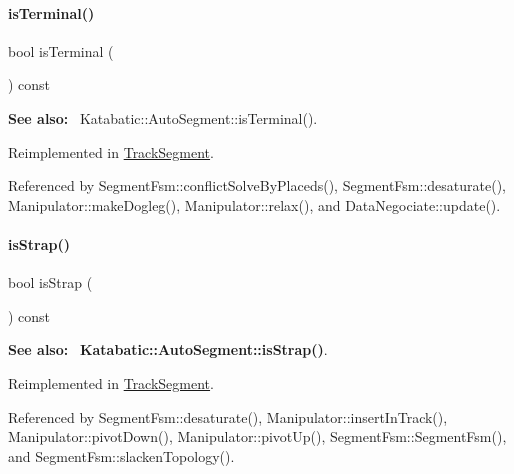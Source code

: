 \mbox{\label{classKite_1_1TrackElement_a1e074cb3064037035548e5e6d238e315}} 
\paragraph{\texorpdfstring{is\+Terminal()}{isTerminal()}}
{\footnotesize\ttfamily bool is\+Terminal (\begin{DoxyParamCaption}{ }\end{DoxyParamCaption}) const\hspace{0.3cm}{\ttfamily [virtual]}}

{\bfseries See also\+:}~ Katabatic\+::\+Auto\+Segment\+::is\+Terminal(). 

Reimplemented in \hyperlink{classKite_1_1TrackSegment_a1e074cb3064037035548e5e6d238e315}{Track\+Segment}.



Referenced by Segment\+Fsm\+::conflict\+Solve\+By\+Placeds(), Segment\+Fsm\+::desaturate(), Manipulator\+::make\+Dogleg(), Manipulator\+::relax(), and Data\+Negociate\+::update().

\mbox{\label{classKite_1_1TrackElement_a62d61c231cf404a814ae37665fa8164f}} 
\paragraph{\texorpdfstring{is\+Strap()}{isStrap()}}
{\footnotesize\ttfamily bool is\+Strap (\begin{DoxyParamCaption}{ }\end{DoxyParamCaption}) const\hspace{0.3cm}{\ttfamily [virtual]}}

{\bfseries See also\+:}~ \textbf{ Katabatic\+::\+Auto\+Segment\+::is\+Strap()}. 

Reimplemented in \hyperlink{classKite_1_1TrackSegment_a62d61c231cf404a814ae37665fa8164f}{Track\+Segment}.



Referenced by Segment\+Fsm\+::desaturate(), Manipulator\+::insert\+In\+Track(), Manipulator\+::pivot\+Down(), Manipulator\+::pivot\+Up(), Segment\+Fsm\+::\+Segment\+Fsm(), and Segment\+Fsm\+::slacken\+Topology().


